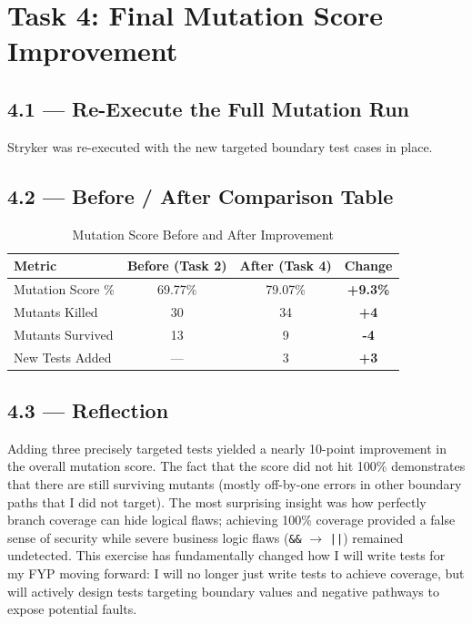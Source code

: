 \documentclass[11pt,a4paper]{article}
\begin{document}
\newpage
\section{Task 4: Final Mutation Score Improvement}

\subsection{4.1 — Re-Execute the Full Mutation Run}
Stryker was re-executed with the new targeted boundary test cases in place.

\subsection{4.2 — Before / After Comparison Table}
\begin{table}[h!]
    \centering
    \renewcommand{\arraystretch}{1.3}
    \begin{tabularx}{0.8\textwidth}{l c c c}
        \toprule
        \textbf{Metric} & \textbf{Before (Task 2)} & \textbf{After (Task 4)} & \textbf{Change} \\
        \midrule
        Mutation Score \% & 69.77\% & 79.07\% & \textcolor{codegreen}{\textbf{+9.3\%}} \\
        Mutants Killed & 30 & 34 & \textcolor{codegreen}{\textbf{+4}} \\
        Mutants Survived & 13 & 9 & \textcolor{codegreen}{\textbf{-4}} \\
        New Tests Added & — & 3 & \textcolor{codegreen}{\textbf{+3}} \\
        \bottomrule
    \end{tabularx}
    \caption{Mutation Score Before and After Improvement}
\end{table}

\subsection{4.3 — Reflection}
Adding three precisely targeted tests yielded a nearly 10-point improvement in the overall mutation score. The fact that the score did not hit 100\% demonstrates that there are still surviving mutants (mostly off-by-one errors in other boundary paths that I did not target). The most surprising insight was how perfectly branch coverage can hide logical flaws; achieving 100\% coverage provided a false sense of security while severe business logic flaws (\texttt{\&\&} $\rightarrow$ \texttt{||}) remained undetected. This exercise has fundamentally changed how I will write tests for my FYP moving forward: I will no longer just write tests to achieve coverage, but will actively design tests targeting boundary values and negative pathways to expose potential faults.
\end{document}
